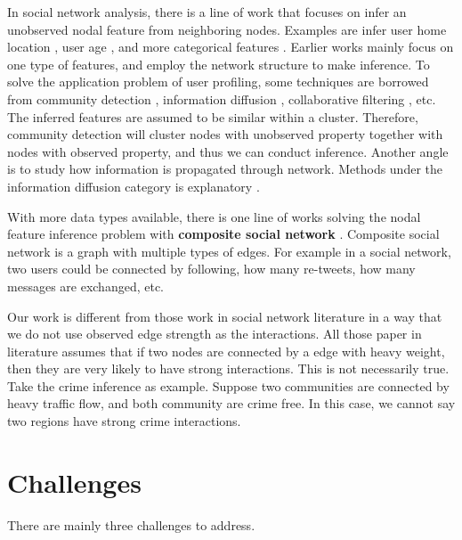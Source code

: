 In social network analysis, there is a line of work that focuses on infer an unobserved  nodal feature from neighboring nodes. Examples are infer user home location \cite{Pontes:2012:WKY:2370216.2370419, Li:2012:TSU:2339530.2339692}, user age \cite{6195711}, and more categorical features \cite{Mislove:2010:YYK:1718487.1718519}. Earlier works mainly focus on one type of features, and employ the network structure to make inference. To solve the application problem of user profiling, some techniques are borrowed from community detection \cite{fortunato2010community}, information diffusion \cite{guille2013information}, collaborative filtering \cite{breese1998empirical}, etc. The inferred features are assumed to be similar within a cluster. Therefore, community detection will cluster nodes with unobserved property together with nodes with observed property, and thus we can conduct inference. Another angle is to study how information is propagated through network. Methods under the information diffusion category is explanatory \cite{rodriguez2011uncovering, gomez2010inferring}.


With more data types available, there is one line of works solving the nodal feature inference problem with \textbf{composite social network} \cite{pan2011composite, madan2011pervasive,zhong2012comsoc}. Composite social network is a graph with multiple types of edges. For example in a social network, two users could be connected by following, how many re-tweets, how many messages are exchanged, etc. 


Our work is different from those work in social network literature in a way that we do not use observed edge strength as the interactions. All those paper in literature assumes that if two nodes are connected by a edge with heavy weight, then they are very likely to have strong interactions. This is not necessarily true. Take the crime inference as example. Suppose two communities are connected by heavy traffic flow, and both community are crime free. In this case, we cannot say two regions have strong crime interactions.







\section{Challenges}

There are mainly three challenges to address.

